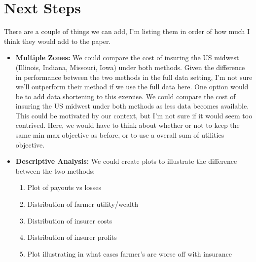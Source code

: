 \documentclass[11pt]{article}
\begin{document}
\section{Next Steps}
  There are a couple of things we can add, I'm listing them in order of how much I think they would add to the paper. 
\begin{itemize}
  \item \textbf{Multiple Zones:} We could compare the cost of insuring the US midwest (Illinois, Indiana, Missouri, Iowa) under both methods. Given the difference in performance between the two methods in the full data setting, I'm not sure we'll outperform their method if we use the full data here. One option would be to add data shortening to this exercise. We could compare the cost of insuring the US midwest under both methods as less data becomes available. This could be motivated by our context, but I'm not sure if it would seem too contrived. Here, we would have to think about whether or not to keep the same min max objective as before, or to use a overall sum of utilities objective. 
  \item \textbf{Descriptive Analysis:} We could create plots to illustrate the difference between the two methods: 
    \begin{enumerate}
      \item Plot of payouts vs losses
      \item Distribution of farmer utility/wealth
      \item Distribution of insurer costs
      \item Distribution of insurer profits
      \item Plot illustrating in what cases farmer's are worse off with insurance
    \end{enumerate}
\end{itemize}
\end{document}
